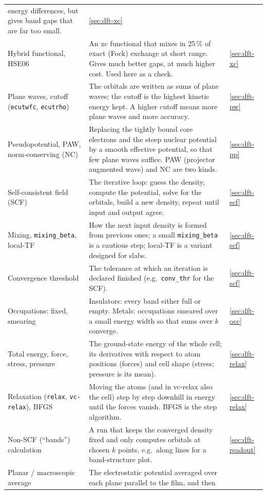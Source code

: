 \begin{small}
\begin{longtable}{@{}>{\raggedright\arraybackslash}p{3.3cm}>{\raggedright\arraybackslash}p{9.0cm}>{\raggedright\arraybackslash}p{1.6cm}@{}}
energy differences, but gives band gaps that are far too small. & \ref{sec:dft-xc} \\
Hybrid functional, HSE06 & An xc functional that mixes in 25\,\% of exact (Fock) exchange at short range. Gives much
better gaps, at much higher cost. Used here as a check. & \ref{sec:dft-xc} \\
Plane waves, cutoff (\texttt{ecutwfc}, \texttt{ecutrho}) & The orbitals are written as sums of plane waves; the cutoff
is the highest kinetic energy kept. A higher cutoff means more plane waves and more accuracy. & \ref{sec:dft-pw} \\
Pseudopotential, PAW, norm-conserving (NC) & Replacing the tightly bound core electrons and the steep nuclear potential
by a smooth effective potential, so that few plane waves suffice. PAW (projector augmented wave) and NC are two kinds. & \ref{sec:dft-pp} \\
Self-consistent field (SCF) & The iterative loop: guess the density, compute the potential, solve for the orbitals,
build a new density, repeat until input and output agree. & \ref{sec:dft-scf} \\
Mixing, \texttt{mixing\_beta}, local-TF & How the next input density is formed from previous ones; a small
\texttt{mixing\_beta} is a cautious step; local-TF is a variant designed for slabs. & \ref{sec:dft-scf} \\
Convergence threshold & The tolerance at which an iteration is declared finished (e.g.\ \texttt{conv\_thr} for the SCF). & \ref{sec:dft-scf} \\
Occupations: fixed, smearing & Insulators: every band either full or empty. Metals: occupations smeared over a small
energy width so that sums over $k$ converge. & \ref{sec:dft-occ} \\
Total energy, force, stress, pressure & The ground-state energy of the whole cell; its derivatives with respect to atom
positions (forces) and cell shape (stress; pressure is its mean). & \ref{sec:dft-relax} \\
Relaxation (\texttt{relax}, \texttt{vc-relax}), BFGS & Moving the atoms (and in vc-relax also the cell) step by step
downhill in energy until the forces vanish. BFGS is the step algorithm. & \ref{sec:dft-relax} \\
Non-SCF (``bands'') calculation & A run that keeps the converged density fixed and only computes orbitals at
chosen $k$ points, e.g.\ along lines for a band-structure plot. & \ref{sec:dft-readout} \\
Planar / macroscopic average & The electrostatic potential averaged over each plane parallel to the film, and then

\end{longtable}
\end{small}
